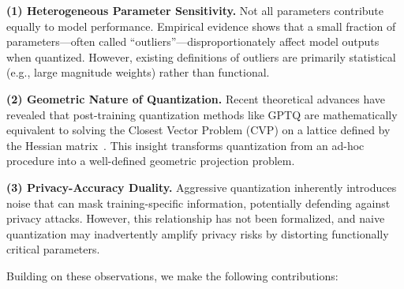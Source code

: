 \documentclass[letterpaper,twocolumn,10pt]{article}
\begin{document}
\textbf{(1) Heterogeneous Parameter Sensitivity.} Not all parameters contribute equally to model performance. Empirical evidence shows that a small fraction of parameters---often called ``outliers''---disproportionately affect model outputs when quantized. However, existing definitions of outliers are primarily statistical (e.g., large magnitude weights) rather than functional.

\textbf{(2) Geometric Nature of Quantization.} Recent theoretical advances have revealed that post-training quantization methods like GPTQ are mathematically equivalent to solving the Closest Vector Problem (CVP) on a lattice defined by the Hessian matrix~\cite{frantar2022gptq}. This insight transforms quantization from an ad-hoc procedure into a well-defined geometric projection problem.

\textbf{(3) Privacy-Accuracy Duality.} Aggressive quantization inherently introduces noise that can mask training-specific information, potentially defending against privacy attacks. However, this relationship has not been formalized, and naive quantization may inadvertently amplify privacy risks by distorting functionally critical parameters.

Building on these observations, we make the following contributions:
\end{document}
